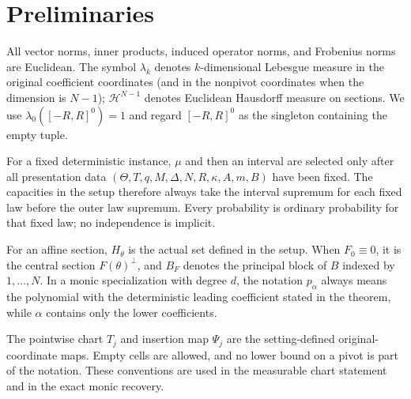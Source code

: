 \section{Preliminaries}\label{sec:preliminaries}

All vector norms, inner products, induced operator norms, and Frobenius norms are Euclidean. The symbol
$\lambda_k$ denotes $k$-dimensional Lebesgue measure in the original coefficient coordinates (and in the
nonpivot coordinates when the dimension is $N-1$); $\mathcal H^{N-1}$ denotes Euclidean Hausdorff measure on
sections. We use $\lambda_0([-R,R]^0)=1$ and regard $[-R,R]^0$ as the singleton containing the empty tuple.

For a fixed deterministic instance, $\mu$ and then an interval are selected only after all presentation data
$(\Theta,T,q,M,\Delta,N,R,\kappa,A,m,B)$ have been fixed. The capacities in the setup therefore always take
the interval supremum for each fixed law before the outer law supremum. Every probability is ordinary
probability for that fixed law; no independence is implicit.

For an affine section, $H_\theta$ is the actual set defined in the setup. When $F_0\equiv0$, it is the central
section $F(\theta)^\perp$, and $B_F$ denotes the principal block of $B$ indexed by $1,\ldots,N$. In a monic
specialization with degree $d$, the notation $p_\alpha$ always means the polynomial with the deterministic
leading coefficient stated in the theorem, while $\alpha$ contains only the lower coefficients.

The pointwise chart $T_j$ and insertion map $\Psi_j$ are the setting-defined original-coordinate maps. Empty
cells are allowed, and no lower bound on a pivot is part of the notation. These conventions are used in the
measurable chart statement and in the exact monic recovery.
